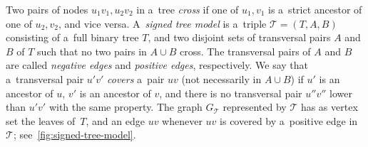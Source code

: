 \documentclass[a4paper,11pt]{article}
\begin{document}
Two pairs of nodes $u_1v_1, u_2v_2$ in a~tree \emph{cross} if one of $u_1, v_1$ is a~strict ancestor of one of $u_2, v_2$, and vice versa. 
A~\emph{signed tree model} is a~triple $\mathcal T=(T, A, B)$ consisting of a~full binary tree $T$, and two disjoint sets of transversal pairs $A$ and $B$ of $T$ such that no two pairs in $A \cup B$ cross.
The transversal pairs of $A$ and $B$ are called \emph{negative edges} and \emph{positive edges}, respectively.
We say that a~transversal pair $u'v'$ \emph{covers} a~pair $uv$ (not necessarily in $A \cup B$) if $u'$ is an ancestor of $u$, $v'$ is an ancestor of $v$, and there is no transversal pair $u''v''$ lower than $u'v'$ with the same property. 
The graph $G_{\mathcal T}$ represented by $\mathcal T$ has as vertex set the leaves of~$T$, and an edge $uv$ whenever $uv$ is covered by a~positive edge in~$\mathcal T$; see~\cref{fig:signed-tree-model}.
\end{document}
